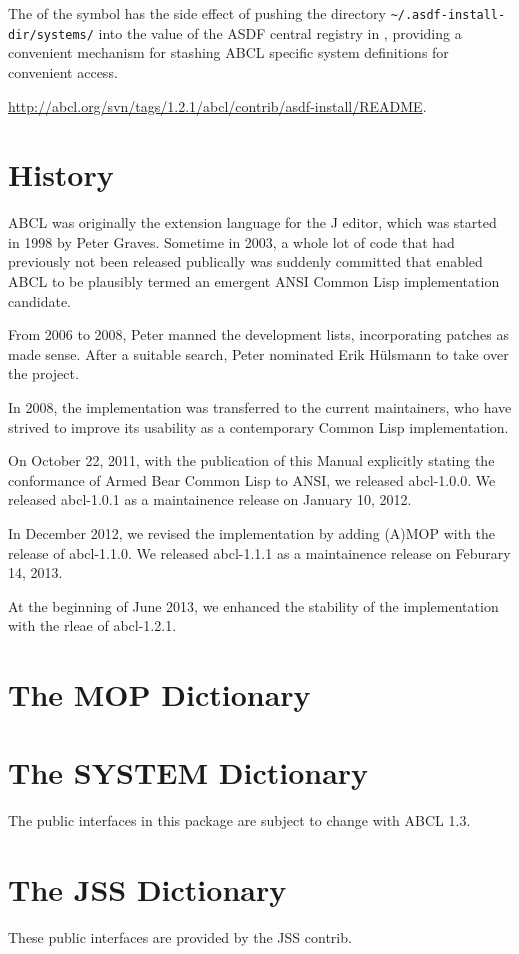 \documentclass[10pt]{book}
\begin{document}
The  of the  symbol has the side
effect of pushing the directory \verb+~/.asdf-install-dir/systems/+ into
the value of the \textsc{ASDF} central registry in
, providing a convenient mechanism for
stashing \textsc{ABCL} specific system definitions for convenient
access.

\url{http://abcl.org/svn/tags/1.2.1/abcl/contrib/asdf-install/README}.


\chapter{History}

\textsc{ABCL} was originally the extension language for the J editor, which was
started in 1998 by Peter Graves.  Sometime in 2003, a whole lot of
code that had previously not been released publically was suddenly
committed that enabled ABCL to be plausibly termed an emergent ANSI
Common Lisp implementation candidate.

From 2006 to 2008, Peter manned the development lists, incorporating
patches as made sense.  After a suitable search, Peter nominated Erik
H\"{u}lsmann to take over the project.

In 2008, the implementation was transferred to the current
maintainers, who have strived to improve its usability as a
contemporary Common Lisp implementation.

On October 22, 2011, with the publication of this Manual explicitly
stating the conformance of Armed Bear Common Lisp to \textsc{ANSI}, we
released abcl-1.0.0.  We released abcl-1.0.1 as a maintainence release
on January 10, 2012.

In December 2012, we revised the implementation by adding
\textsc{(A)MOP} with the release of abcl-1.1.0.  We released
abcl-1.1.1 as a maintainence release on Feburary 14, 2013.

At the beginning of June 2013, we enhanced the stability of the
implementation with the rleae of abcl-1.2.1.

\appendix 

\chapter{The MOP Dictionary}



\chapter{The SYSTEM Dictionary}

The public interfaces in this package are subject to change with
\textsc{ABCL} 1.3.



\chapter{The JSS Dictionary}

These public interfaces are provided by the JSS contrib.






\printindex
\end{document}
